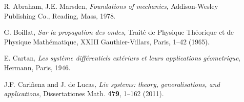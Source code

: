 \documentclass{birkjour}
\theoremstyle{definition}
\theoremstyle{remark}
\numberwithin{equation}{section}
\numberwithin{equation}{section}
\numberwithin{thm}{section}
\numberwithin{equation}{section}
\numberwithin{thm}{section}
\begin{document}
\begin{thebibliography}{10}
	R. Abraham, J.E. Marsden, {\sl Foundations of mechanics}, Addison-Wesley Publishing Co., Reading, Mass, 1978.
	
	G. Boillat, {\it Sur la propagation des ondes}, Trait\'e de Physique Th\'eorique et de Physique Math\'ematique, XXIII Gauthier-Villars, Paris, 1--42   (1965).
	
	
	
	
	E. Cartan, {\sl Les syst\`eme diff\'erentiels ext\'eriurs et leurs applications g\'eometrique}, Hermann, Paris, 1946.
	
	
	J.F. Cari\~nena and J. de Lucas, {\it Lie systems: theory, generalisations, and applications},
	Dissertationes Math. {\bf 479}, 1--162 (2011).
	
	
	

\end{thebibliography}
\end{document}
